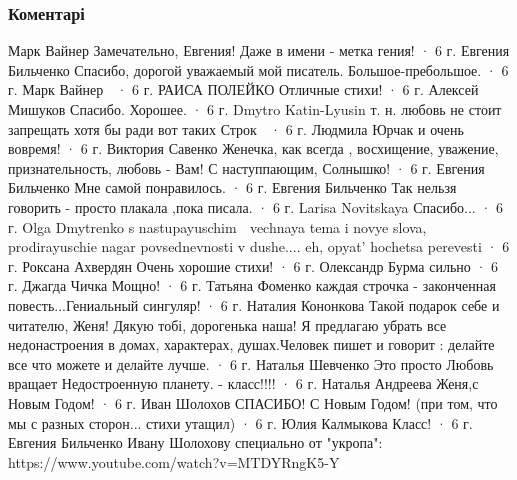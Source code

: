  
 
 
 
 
\subsubsection{Коментарі}

Марк Вайнер
Замечательно, Евгения! Даже в имени - метка гения!
 · 6 г.
Евгения Бильченко
Спасибо, дорогой уважаемый мой писатель. Большое-пребольшое.
 · 6 г.
Марк Вайнер
🙂
 · 6 г.
РАИСА ПОЛЕЙКО
Отличные стихи!
 · 6 г.
Алексей Мишуков
Спасибо.
Хорошее.
 · 6 г.
Dmytro Katin-Lyusin
т. н. любовь не стоит запрещать хотя бы ради вот таких Строк 🙂
 · 6 г.
Людмила Юрчак
и очень вовремя!
 · 6 г.
Виктория Савенко
Женечка, как всегда , восхищение, уважение, признательность, любовь - Вам! С наступпающим, Солнышко!
 · 6 г.
Евгения Бильченко
Мне самой понравилось.
 · 6 г.
Евгения Бильченко
Так нельзя говорить - просто плакала ,пока писала.
 · 6 г.
Larisa Novitskaya
Спасибо...
 · 6 г.
Olga Dmytrenko
s nastupayuschim 🙂 vechnaya tema i novye slova, prodirayuschie nagar povsednevnosti v dushe.... eh, opyat' hochetsa perevesti
 · 6 г.
Роксана Ахвердян
Очень хорошие стихи!
 · 6 г.
Олександр Бурма
сильно
 · 6 г.
Джагда Чичка
Мощно!
 · 6 г.
Татьяна Фоменко
каждая строчка - законченная повесть...Гениальный сингуляр!
 · 6 г.
Наталия Кононкова
Такой подарок себе и читателю, Женя!
Дякую тобі, дорогенька наша!
Я предлагаю убрать все недонастроения в домах, характерах, душах.Человек пишет и говорит : делайте все что можете и делайте лучше.
 · 6 г.
Наталья Шевченко
Это просто Любовь вращает
Недостроенную планету. - класс!!!!
 · 6 г.
Наталья Андреева
Женя,с Новым Годом!
 · 6 г.
Иван Шолохов
СПАСИБО! С Новым Годом! (при том, что мы с разных сторон... стихи утащил)
 · 6 г.
Юлия Калмыкова
Класс!
 · 6 г.
Евгения Бильченко
Ивану Шолохову специально от "укропа": https://www.youtube.com/watch?v=MTDYRngK5-Y
